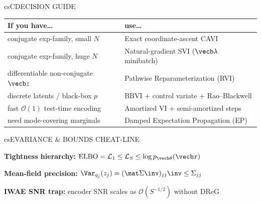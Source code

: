 \documentclass[../../../../master.tex]{subfiles}
\begin{document}
\begin{cscolumns}
\begin{cscard}{csC}{DECISION GUIDE}
  \renewcommand{\arraystretch}{1.22}\small
  \begin{tabular}{@{}>{\raggedright\arraybackslash}p{3.1cm}>{\raggedright\arraybackslash}p{4.6cm}@{}}
    \textbf{If you have\ldots} & \textbf{use\ldots}\\ \hline
    conjugate exp-family, small $N$ & Exact coordinate-ascent CAVI\\
    conjugate exp-family, huge $N$ & Natural-gradient SVI ($\vecb\lambda$ minibatch)\\
    differentiable non-conjugate $\vecb z$ & Pathwise Reparameterization (RVI)\\
    discrete latents / black-box $p$ & BBVI + control variate + Rao--Blackwell\\
    fast $\mathcal O(1)$ test-time encoding & Amortized VI + semi-amortized steps\\
    need mode-covering marginals & Damped Expectation Propagation (EP)\\
  \end{tabular}
\end{cscard}

\begin{cscard}{csE}{VARIANCE \& BOUNDS CHEAT-LINE}
  \begin{csbul}
    \item \textbf{Tightness hierarchy:} $\mathrm{ELBO}=\mathcal L_1\le\mathcal L_S\le\log p_{\vecb\theta}(\vecb x)$
    \item \textbf{Mean-field precision:} $\Var_{q_j}(z_j)=(\mat\Sigma\inv)_{jj}\inv \le \Sigma_{jj}$
    \item \textbf{IWAE SNR trap:} encoder SNR scales as $\mathcal O(S^{-1/2})$ without DReG
  \end{csbul}
\end{cscard}


\end{cscolumns}
\end{document}
